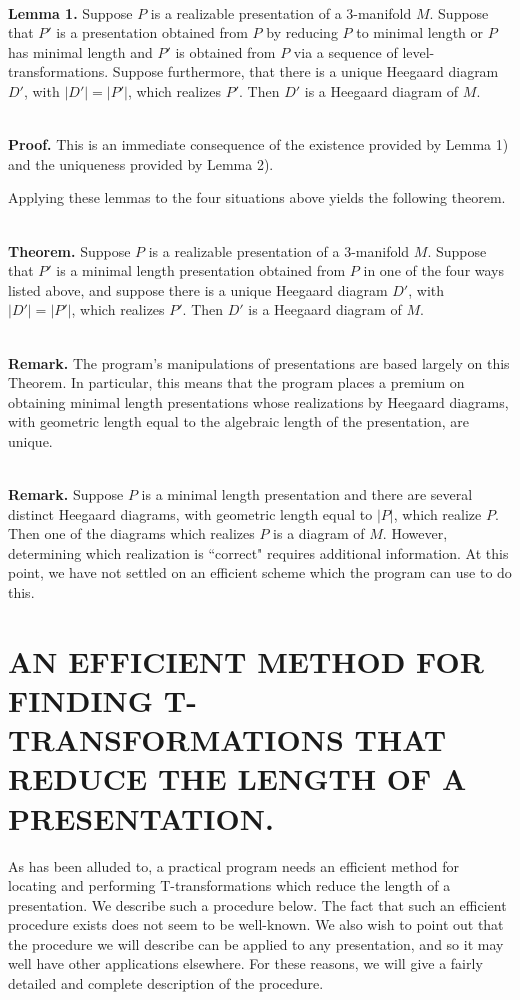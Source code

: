 \documentclass[12pt]{amsart}
\newcommand{\theorem}{\ \\ \noindent  \textbf{Theorem.} }
\newcommand{\remark}{\ \\ \noindent \textbf{Remark.} }
\newcommand{\pf}{\ \\ \noindent \textbf{Proof.} }
\newcommand{\lemmatwo}{\ \\ \noindent  \textbf{Lemma 1.} }
\begin{document}
\lemmatwo        Suppose $P$ is a realizable presentation of a 3-manifold $M$. Suppose that $P'$
        is a presentation obtained from $P$ by reducing $P$ to minimal length or $P$ has minimal
        length and $P'$ is obtained from $P$ via a sequence of level-transformations. Suppose
        furthermore, that there is a unique Heegaard diagram $D'$, with $|D'| = |P'|$, which
        realizes $P'$. Then $D'$ is a Heegaard diagram of $M$.
        
\pf  This is an immediate consequence of the existence provided by Lemma 1) and the
        uniqueness provided by Lemma 2).        

        Applying these lemmas to the four situations above yields the following theorem.
        
\theorem        Suppose $P$ is a realizable presentation of a 3-manifold $M$. Suppose that $P'$ is
        a minimal length presentation obtained from $P$ in one of the four ways listed above,
        and suppose there is a unique Heegaard diagram $D'$, with $|D'| = |P'|$, which realizes $P'$.
        Then $D'$ is a Heegaard diagram of $M$.

\remark The program's manipulations of presentations are based largely on this Theorem.
        In particular, this means that the program places a premium on obtaining minimal length
        presentations whose realizations by Heegaard diagrams, with geometric length equal to
        the algebraic length of the presentation, are unique.
        
\remark Suppose $P$ is a minimal length presentation and there are several distinct Heegaard
        diagrams, with geometric length equal to $|P|$, which realize $P$. Then one of the
        diagrams which realizes $P$ is a diagram of $M$. However, determining which realization
        is  ``correct" requires additional information. At this point, we have not settled on an
        efficient scheme which the program can use to do this.
        
                
\section{AN EFFICIENT METHOD FOR FINDING T-TRANSFORMATIONS THAT REDUCE THE LENGTH OF A  PRESENTATION.}
        
As has been alluded to, a practical program needs an efficient method
for locating and performing T-transformations which reduce the length
of a presentation. We describe such a procedure below. The fact that
such an efficient procedure exists does not seem to be well-known. We
also wish to point out that the procedure we will describe can be
applied to any presentation, and so it may well have other
applications elsewhere.  For these reasons, we will give a fairly
detailed and complete description of the procedure.
                
\end{document}
